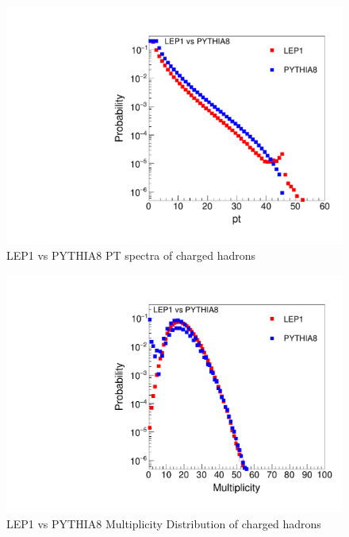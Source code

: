 \begin{figure}[H]
\begin{center}
\includegraphics[width=.45\textwidth]{images/DataQualityCheck/pt_LEP1_PYTHIA8.pdf}
\caption{LEP1 vs PYTHIA8 PT spectra of charged hadrons}
\label{fig:figure11} 
\end{center}
\end{figure}

\begin{figure}[H]
\begin{center}
\includegraphics[width=.45\textwidth]{images/DataQualityCheck/mult_LEP1_PYTHIA8.pdf}
\caption{LEP1 vs PYTHIA8 Multiplicity Distribution of charged hadrons}
\label{fig:figure12} 
\end{center}
\end{figure}

